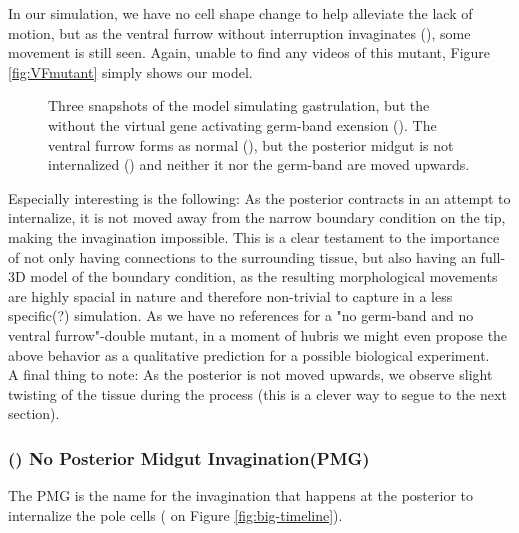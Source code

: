 In our simulation, we have no cell shape change to help alleviate the lack of motion, but as the ventral furrow without interruption invaginates (), some movement is still seen. 
Again, unable to find any videos of this mutant, Figure \ref{fig:VFmutant} simply shows our model.

\begin{figure}[H]
    \centering

    \caption{Three snapshots of the model simulating gastrulation, but the without the virtual gene activating germ-band exension (). The ventral furrow forms as normal (), but the posterior midgut is not internalized () and neither it nor the germ-band are moved upwards.}
    \label{fig:germ-band-mutant}
\end{figure}



Especially interesting is the following: As the posterior contracts in an attempt to internalize, it is not moved away from the narrow boundary condition on the tip, making the invagination impossible. This is a clear testament to the importance of not only having  connections to the surrounding tissue, but also having an full-3D model of the boundary condition, as the resulting morphological movements are highly spacial in nature and therefore non-trivial to capture in a less specific(?) simulation. As we have no references for a "no germ-band and no ventral furrow"-double mutant, in a moment of hubris we might even propose the above behavior as a qualitative prediction for a possible biological experiment.\\  
A final thing to note: As the posterior is not moved upwards, we observe slight twisting of the tissue during the process (this is a clever way to segue to the next section). 


\subsubsection{() No Posterior Midgut Invagination(PMG)}
The PMG is the name for the invagination that happens at the posterior to internalize the pole cells ( on Figure \ref{fig:big-timeline}).

